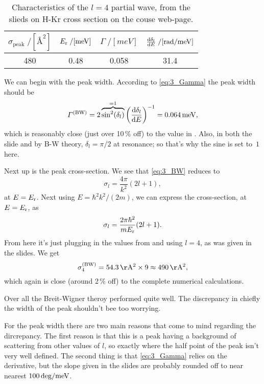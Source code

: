 \documentclass[11pt,letter, swedish, english
]{article}
\begin{document}
\begin{table}\centering
\caption{Characteristics of the $l=4$ partial wave, from the slieds on
H-Kr cross section on the couse web-page.}
\label{tab:3}
\begin{tabular}{|c|c|c|c|}\hline
$\sigma_\text{peak}\;/[\unit{Å^2}]$  & $\Er\;/[\unit{meV}]$ &
$\varGamma\;/[\unit{meV}]$  & $\dv{\delta_l}{E}\;/[\unit{rad/meV}]$ 
\\ \hline
480 & 0.48 & 0.058 & 31.4\\ \hline
\end{tabular}
\end{table}

We can begin with the peak width. According to \eqref{eq:3_Gamma} the
peak width should be
\begin{equation}
\varGamma^\BW=2\overbrace{\sin^2(\delta_l)}^{=1}
\qty(\dv{\delta_l}{E})^{-1}
=\unit[0.064]{meV},
\end{equation}
which is reasonably close (just over 10\,\% off) to the value in
. Also, in both the slide and by B-W theory,
$\delta_l=\pi/2$ at resonance; so that's why the sine is set to~$1$ here.

Next up is the peak cross-section. We see that \eqref{eq:3_BW} reduces
to
\begin{equation}
\sigma_l=\frac{4\pi}{k^2} (2l+1),
\end{equation}
at $E=E_{\text{r}}$. Next using $E=\hbar^2k^2/(2m)$, we can express the
cross-section, at $E=E_{\text{r}}$, as
\begin{equation}\label{eq:3_BW_Er}
\sigma_l=\frac{2\pi\hbar^2}{mE_{\text{r}}} (2l+1).
\end{equation}
From here it's just plugging in the values from  and
using $l=4$, as was given in the slides. We get
\begin{equation}
\sigma_4^{\BW}=\unit[54.3]{Å^2}\times9\approx\unit[490]{Å^2},
\end{equation}
which again is close (around 2\,\% off) to the complete numerical
calculations. 

Over all the Breit-Wigner theroy performed quite well. The discrepancy
in chiefly the width of the peak shouldn't bee too worrying. 

For the
peak width there are two main reasons that come to mind regarding the
dircrepancy. The first reason is that this is a peak having a
background of scattering from other values of $l$, so exactly where
the half point of the peak isn't very well defined. The second thing
is that \eqref{eq:3_Gamma} relies on the derivative, but the slope
given in the slides are probably rounded off to near nearest
$\unit[100]{deg/meV}$. 
\end{document}
